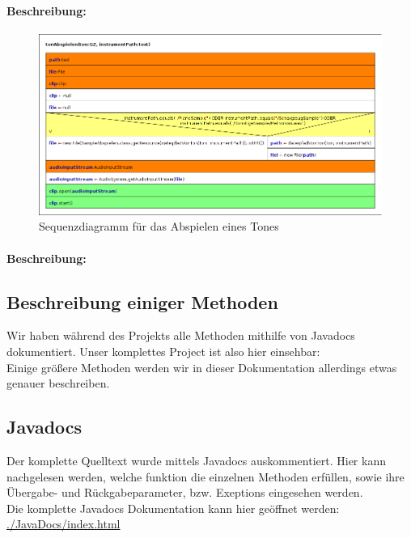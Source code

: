 \paragraph{Beschreibung:} 


\newpage

\begin{figure}[h]
 \centering
 \includegraphics[width=1\textwidth]{./Bilder/tonAbspielen.png}
 \caption{Sequenzdiagramm für das Abspielen eines Tones}
\end{figure}

\paragraph{Beschreibung:} 

\newpage


\subsection{Beschreibung einiger Methoden}




Wir haben während des Projekts alle Methoden mithilfe von Javadocs dokumentiert. Unser komplettes 
Project ist also hier einsehbar: %
\\

Einige größere Methoden werden wir in dieser Dokumentation allerdings etwas genauer beschreiben.

\subsection{Javadocs}
Der komplette Quelltext wurde mittels Javadocs auskommentiert. Hier kann nachgelesen werden, welche 
funktion die einzelnen Methoden erfüllen, sowie ihre Übergabe- und Rückgabeparameter, bzw. 
Exeptions  eingesehen werden.\\
Die komplette Javadocs Dokumentation kann hier geöffnet werden:\\
\url{./JavaDocs/index.html}